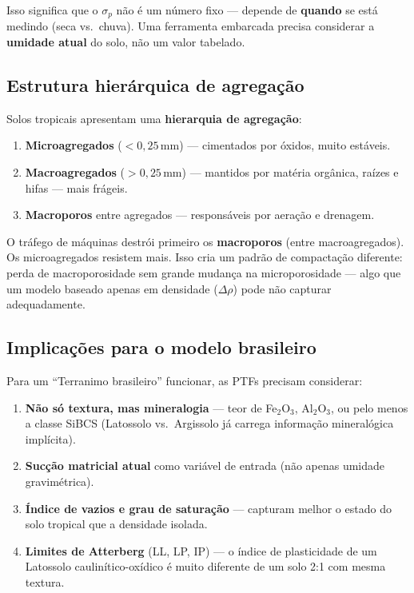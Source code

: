 \documentclass[12pt,a4paper]{article}
\newcommand{\Subsection}[1]{\needspace{10\baselineskip}\subsection{#1}}
\begin{document}
Isso significa que o $\sigma_p$ não é um número fixo --- depende de \textbf{quando} se está medindo (seca vs.\ chuva). Uma ferramenta embarcada precisa considerar a \textbf{umidade atual} do solo, não um valor tabelado.

\Subsection{Estrutura hierárquica de agregação}

Solos tropicais apresentam uma \textbf{hierarquia de agregação}:

\begin{enumerate}
  \item \textbf{Microagregados} ($< 0{,}25$\,mm) --- cimentados por óxidos, muito estáveis.
  \item \textbf{Macroagregados} ($> 0{,}25$\,mm) --- mantidos por matéria orgânica, raízes e hifas --- mais frágeis.
  \item \textbf{Macroporos} entre agregados --- responsáveis por aeração e drenagem.
\end{enumerate}

O tráfego de máquinas destrói primeiro os \textbf{macroporos} (entre macroagregados). Os microagregados resistem mais. Isso cria um padrão de compactação diferente: perda de macroporosidade sem grande mudança na microporosidade --- algo que um modelo baseado apenas em densidade ($\Delta\rho$) pode não capturar adequadamente.

\Subsection{Implicações para o modelo brasileiro}

Para um ``Terranimo brasileiro'' funcionar, as PTFs precisam considerar:

\begin{enumerate}
  \item \textbf{Não só textura, mas mineralogia} --- teor de Fe$_2$O$_3$, Al$_2$O$_3$, ou pelo menos a classe SiBCS (Latossolo vs.\ Argissolo já carrega informação mineralógica implícita).
  \item \textbf{Sucção matricial atual} como variável de entrada (não apenas umidade gravimétrica).
  \item \textbf{Índice de vazios e grau de saturação} --- capturam melhor o estado do solo tropical que a densidade isolada.
  \item \textbf{Limites de Atterberg} (LL, LP, IP) --- o índice de plasticidade de um Latossolo caulinítico-oxídico é muito diferente de um solo 2:1 com mesma textura.
\end{enumerate}
\end{document}
